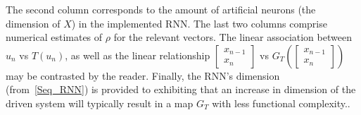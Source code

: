 \begin{center}
\begin{table}
{      The second column corresponds to the amount of artificial neurons (the dimension of $X$) in the implemented RNN.
      The last two columns comprise numerical estimates of $\rho$ for the relevant vectors. The linear association between $u_n$ vs $T(u_{n})$, as well as the linear relationship $\begin{bmatrix}
              x_{n-1}\\
              x_n
          \end{bmatrix}$ vs $G_T \left( \begin{bmatrix}
              x_{n-1}\\
              x_n
          \end{bmatrix}\right)$ may be contrasted by the reader. 
          Finally, the RNN's dimension (from~\eqref{Seq_RNN}) is provided to exhibiting that an increase in dimension of the driven system will 
          typically result in a map $G_T$ with less functional complexity.}.
      \end{table}\label{tbl_attractorsPearson}
\end{center}

  
